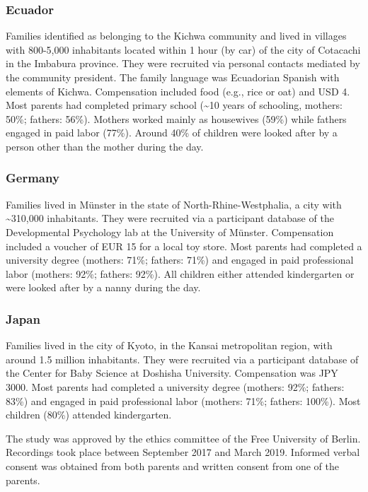 \documentclass[
  man,floatsintext]{apa6}
\begin{document}
\hypertarget{ecuador}{%
\subsubsection{Ecuador}\label{ecuador}}

Families identified as belonging to the Kichwa community and lived in villages with 800-5,000 inhabitants located within 1 hour (by car) of the city of Cotacachi in the Imbabura province. They were recruited via personal contacts mediated by the community president. The family language was Ecuadorian Spanish with elements of Kichwa. Compensation included food (e.g., rice or oat) and USD 4. Most parents had completed primary school (\textasciitilde10 years of schooling, mothers: 50\%; fathers: 56\%). Mothers worked mainly as housewives (59\%) while fathers engaged in paid labor (77\%). Around 40\% of children were looked after by a person other than the mother during the day.

\hypertarget{germany}{%
\subsubsection{Germany}\label{germany}}

Families lived in Münster in the state of North-Rhine-Westphalia, a city with \textasciitilde310,000 inhabitants. They were recruited via a participant database of the Developmental Psychology lab at the University of Münster. Compensation included a voucher of EUR 15 for a local toy store. Most parents had completed a university degree (mothers: 71\%; fathers: 71\%) and engaged in paid professional labor (mothers: 92\%; fathers: 92\%). All children either attended kindergarten or were looked after by a nanny during the day.

\hypertarget{japan}{%
\subsubsection{Japan}\label{japan}}

Families lived in the city of Kyoto, in the Kansai metropolitan region, with around 1.5 million inhabitants. They were recruited via a participant database of the Center for Baby Science at Doshisha University. Compensation was JPY 3000. Most parents had completed a university degree (mothers: 92\%; fathers: 83\%) and engaged in paid professional labor (mothers: 71\%; fathers: 100\%). Most children (80\%) attended kindergarten.

The study was approved by the ethics committee of the Free University of Berlin. Recordings took place between September 2017 and March 2019. Informed verbal consent was obtained from both parents and written consent from one of the parents.
\end{document}
